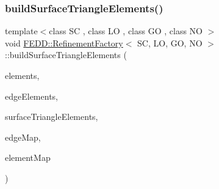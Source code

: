\mbox{\label{classFEDD_1_1RefinementFactory_a0393fc1497f3b0e02380af00b93e96d6}} 
\subsubsection{\texorpdfstring{build\+Surface\+Triangle\+Elements()}{buildSurfaceTriangleElements()}}
{\footnotesize\ttfamily template$<$class SC , class LO , class GO , class NO $>$ \\
void \hyperlink{classFEDD_1_1RefinementFactory}{F\+E\+D\+D\+::\+Refinement\+Factory}$<$ SC, LO, GO, NO $>$\+::build\+Surface\+Triangle\+Elements (\begin{DoxyParamCaption}\item[{\hyperlink{classFEDD_1_1RefinementFactory_a0994b5b7b6d080048673941251999f2e}{Elements\+Ptr\+\_\+\+Type}}]{elements,  }\item[{\hyperlink{classFEDD_1_1RefinementFactory_ae5285e990ec4632d6188a1280627ad13}{Edge\+Elements\+Ptr\+\_\+\+Type}}]{edge\+Elements,  }\item[{\hyperlink{classFEDD_1_1RefinementFactory_a1067ba23325b19eae16a864f25f7d68f}{Surface\+Elements\+Ptr\+\_\+\+Type}}]{surface\+Triangle\+Elements,  }\item[{\hyperlink{classFEDD_1_1RefinementFactory_a8256ccdf1b2a5c977ddc011f4e8eb8d3}{Map\+Const\+Ptr\+\_\+\+Type}}]{edge\+Map,  }\item[{\hyperlink{classFEDD_1_1RefinementFactory_a8256ccdf1b2a5c977ddc011f4e8eb8d3}{Map\+Const\+Ptr\+\_\+\+Type}}]{element\+Map }\end{DoxyParamCaption})}

\mbox{\label{classFEDD_1_1RefinementFactory_a97003a4445b40ac91728639de432a449}} 
